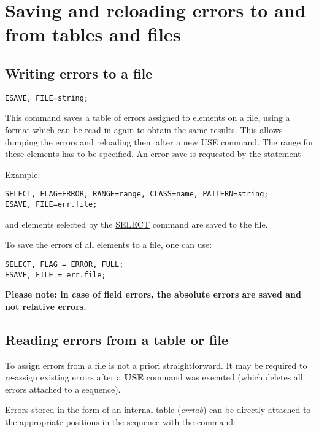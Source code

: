 
\section{Saving and reloading errors to and from tables and files} 

\subsection{Writing errors to a file}

\begin{verbatim}
ESAVE, FILE=string;
\end{verbatim}

This command saves a table of errors assigned to elements on a file,
using a format which can be read in again to obtain the same
results. This allows dumping the errors and reloading them after a new
USE command. The range for these elements has to be specified. An error
save is requested by the statement  

Example: 
\begin{verbatim}
SELECT, FLAG=ERROR, RANGE=range, CLASS=name, PATTERN=string;
ESAVE, FILE=err.file;
\end{verbatim} 
and elements selected by the  \href{../Introduction/select.html}{SELECT}
command are saved to the file.  


To save the errors of all elements to a file, one can use: 
\begin{verbatim}
SELECT, FLAG = ERROR, FULL;                                    
ESAVE, FILE = err.file;
\end{verbatim}

{\bf Please note: in case of field errors, the absolute errors are
  saved and not relative errors. } 

\subsection{Reading errors from a table or file}

To assign errors from a file is not a priori straightforward. It may be
required to re-assign existing errors after a \textbf{USE} command was
executed (which deletes all errors attached to a sequence).  

Errors stored in the form of an internal table (\textit{errtab}) can  be
directly attached to the appropriate positions in the sequence with the
command:  

